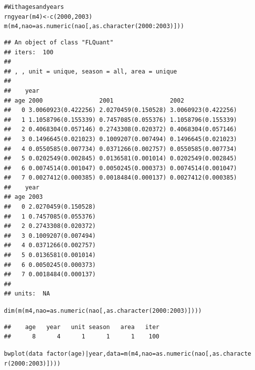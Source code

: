 \documentclass[a4paper,english,10pt]{article}\usepackage[]{graphicx}\usepackage[]{color}
\makeatletter
\newcommand{\hlnum}[1]{\textcolor[rgb]{0.2,0.2,0.2}{#1}}%
\newcommand{\hlcom}[1]{\textcolor[rgb]{0.2,0.267,0.4}{#1}}%
\newcommand{\hlopt}[1]{\textcolor[rgb]{0.2,0.2,0.2}{#1}}%
\newcommand{\hlstd}[1]{\textcolor[rgb]{0,0,0}{#1}}%
\newcommand{\hlkwb}[1]{\textcolor[rgb]{0.361,0.506,0.596}{#1}}%
\newcommand{\hlkwc}[1]{\textcolor[rgb]{0.361,0.506,0.596}{#1}}%
\newcommand{\hlkwd}[1]{\textcolor[rgb]{0.361,0.506,0.596}{#1}}%
\newenvironment{kframe}{%
 \def\at@end@of@kframe{}%
 \ifinner\ifhmode%
  \def\at@end@of@kframe{\end{minipage}}%
  \begin{minipage}{\columnwidth}%
 \fi\fi%
 \def\FrameCommand##1{\hskip\@totalleftmargin \hskip-\fboxsep
 \colorbox{shadecolor}{##1}\hskip-\fboxsep
     \hskip-\linewidth \hskip-\@totalleftmargin \hskip\columnwidth}%
 \MakeFramed {\advance\hsize-\width
   \@totalleftmargin\z@ \linewidth\hsize
   \@setminipage}}%
 {\par\unskip\endMakeFramed%
 \at@end@of@kframe}
\newenvironment{knitrout}{}{} %
\makeatother
\begin{document}
\begin{knitrout}
\begin{kframe}
\begin{alltt}
\hlcom{# With ages and years}
\hlkwd{rngyear}\hlstd{(m4)} \hlkwb{<-} \hlkwd{c}\hlstd{(}\hlnum{2000}\hlstd{,} \hlnum{2003}\hlstd{)}
\hlkwd{m}\hlstd{(m4,} \hlkwc{nao} \hlstd{=} \hlkwd{as.numeric}\hlstd{(nao[,} \hlkwd{as.character}\hlstd{(}\hlnum{2000}\hlopt{:}\hlnum{2003}\hlstd{)]))}
\end{alltt}
\begin{verbatim}
## An object of class "FLQuant"
## iters:  100 
## 
## , , unit = unique, season = all, area = unique
## 
##    year
## age 2000                2001                2002               
##   0 3.0060923(0.422256) 2.0270459(0.150528) 3.0060923(0.422256)
##   1 1.1058796(0.155339) 0.7457085(0.055376) 1.1058796(0.155339)
##   2 0.4068304(0.057146) 0.2743308(0.020372) 0.4068304(0.057146)
##   3 0.1496645(0.021023) 0.1009207(0.007494) 0.1496645(0.021023)
##   4 0.0550585(0.007734) 0.0371266(0.002757) 0.0550585(0.007734)
##   5 0.0202549(0.002845) 0.0136581(0.001014) 0.0202549(0.002845)
##   6 0.0074514(0.001047) 0.0050245(0.000373) 0.0074514(0.001047)
##   7 0.0027412(0.000385) 0.0018484(0.000137) 0.0027412(0.000385)
##    year
## age 2003               
##   0 2.0270459(0.150528)
##   1 0.7457085(0.055376)
##   2 0.2743308(0.020372)
##   3 0.1009207(0.007494)
##   4 0.0371266(0.002757)
##   5 0.0136581(0.001014)
##   6 0.0050245(0.000373)
##   7 0.0018484(0.000137)
## 
## units:  NA
\end{verbatim}
\begin{alltt}
\hlkwd{dim}\hlstd{(}\hlkwd{m}\hlstd{(m4,} \hlkwc{nao} \hlstd{=} \hlkwd{as.numeric}\hlstd{(nao[,} \hlkwd{as.character}\hlstd{(}\hlnum{2000}\hlopt{:}\hlnum{2003}\hlstd{)])))}
\end{alltt}
\begin{verbatim}
##    age   year   unit season   area   iter 
##      8      4      1      1      1    100
\end{verbatim}
\end{kframe}
\end{knitrout}


\begin{knitrout}
\color{fgcolor}\begin{kframe}
\begin{alltt}
\hlkwd{bwplot}\hlstd{(data} \hlopt{~} \hlkwd{factor}\hlstd{(age)} \hlopt{|} \hlstd{year,} \hlkwc{data} \hlstd{=} \hlkwd{m}\hlstd{(m4,} \hlkwc{nao} \hlstd{=} \hlkwd{as.numeric}\hlstd{(nao[,} \hlkwd{as.character}\hlstd{(}\hlnum{2000}\hlopt{:}\hlnum{2003}\hlstd{)])))}
\end{alltt}
\end{kframe}
\end{knitrout}
\end{document}
